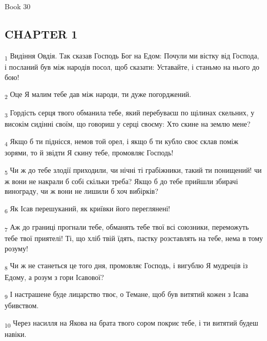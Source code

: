 Book 30
\subsection{CHAPTER 1}
\begin{tcolorbox}
\textsubscript{1} Видіння Овдія. Так сказав Господь Бог на Едом: Почули ми вістку від Господа, і посланий був між народів посол, щоб сказати: Уставайте, і станьмо на нього до бою!
\end{tcolorbox}
\begin{tcolorbox}
\textsubscript{2} Оце Я малим тебе дав між народи, ти дуже погорджений.
\end{tcolorbox}
\begin{tcolorbox}
\textsubscript{3} Гордість серця твого обманила тебе, який перебуваєш по щілинах скельних, у високім сидінні своїм, що говориш у серці своєму: Хто скине на землю мене?
\end{tcolorbox}
\begin{tcolorbox}
\textsubscript{4} Якщо б ти піднісся, немов той орел, і якщо б ти кубло своє склав поміж зорями, то й звідти Я скину тебе, промовляє Господь!
\end{tcolorbox}
\begin{tcolorbox}
\textsubscript{5} Чи ж до тебе злодії приходили, чи нічні ті грабіжники, такий ти понищений! чи ж вони не накрали б собі скільки треба? Якщо б до тебе прийшли збирачі винограду, чи ж вони не лишили б хоч вибірків?
\end{tcolorbox}
\begin{tcolorbox}
\textsubscript{6} Як Ісав перешуканий, як криївки його переглянені!
\end{tcolorbox}
\begin{tcolorbox}
\textsubscript{7} Аж до границі прогнали тебе, обманять тебе твої всі союзники, переможуть тебе твої приятелі! Ті, що хліб твій їдять, пастку розставлять на тебе, нема в тому розуму!
\end{tcolorbox}
\begin{tcolorbox}
\textsubscript{8} Чи ж не станеться це того дня, промовляє Господь, і вигублю Я мудреців із Едому, а розум з гори Ісавової?
\end{tcolorbox}
\begin{tcolorbox}
\textsubscript{9} І настрашене буде лицарство твоє, о Темане, щоб був витятий кожен з Ісава убивством.
\end{tcolorbox}
\begin{tcolorbox}
\textsubscript{10} Через насилля на Якова на брата твого сором покриє тебе, і ти витятий будеш навіки.
\end{tcolorbox}
